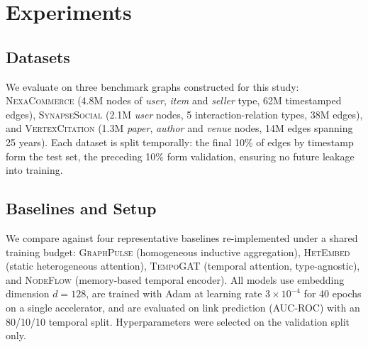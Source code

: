 \section{Experiments}
\label{sec:experiments}
\subsection{Datasets}
We evaluate on three benchmark graphs constructed for this study:
\textsc{NexaCommerce} (4.8M nodes of \emph{user}, \emph{item} and \emph{seller}
type, 62M timestamped edges), \textsc{SynapseSocial} (2.1M \emph{user}
nodes, 5 interaction-relation types, 38M edges), and
\textsc{VertexCitation} (1.3M \emph{paper}, \emph{author} and \emph{venue} nodes,
14M edges spanning 25 years). Each dataset is split temporally: the final
10\% of edges by timestamp form the test set, the preceding 10\% form
validation, ensuring no future leakage into training.

\subsection{Baselines and Setup}
We compare against four representative baselines re-implemented under a
shared training budget: \textsc{GraphPulse} (homogeneous inductive
aggregation), \textsc{HetEmbed} (static heterogeneous attention),
\textsc{TempoGAT} (temporal attention, type-agnostic), and
\textsc{NodeFlow} (memory-based temporal encoder). All models use embedding
dimension $d=128$, are trained with Adam at learning rate $3\times10^{-4}$
for 40 epochs on a single accelerator, and are evaluated on link prediction
(AUC-ROC) with an 80/10/10 temporal split. Hyperparameters were selected on
the validation split only.
